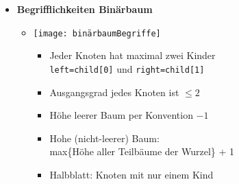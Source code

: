 \begin{itemize}
            \item \textbf{Begrifflichkeiten Binärbaum}
                \begin{itemize}
                    \item[]
                        \begin{minipage}[t]{0.45\textwidth}
                            \texttt{[image: binärbaumBegriffe]}
                        \end{minipage}
                        \begin{minipage}[t]{0.45\textwidth}
                            \vspace{-4.5cm}
                            \begin{itemize}
                                \item Jeder Knoten hat maximal zwei Kinder \\
                                        \texttt{left=child[0]} und \texttt{right=child[1]}
                                \item Ausgangsgrad jedes Knoten ist $\leq 2$
                                \item Höhe leerer Baum per Konvention $-1$
                                \item Hohe (nicht-leerer) Baum: \\
                                        max\{Höhe aller Teilbäume der Wurzel\} + 1
                                \item Halbblatt: Knoten mit nur einem Kind
                            \end{itemize}
                        \end{minipage}
                \end{itemize}

                \pagebreak


\end{itemize}
